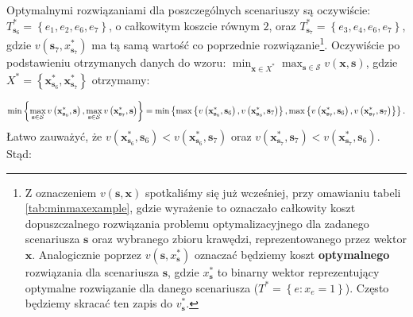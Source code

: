 Optymalnymi rozwiązaniami dla poszczególnych scenariuszy są oczywiście: $T^{\ast}_{\textbf{s}_{6}} = \left\{ e_{1}, e_{2}, e_{6}, e_{7} \right\}$, o całkowitym koszcie równym $2$, oraz $T^{\ast}_{\textbf{s}_{7}} = \left\{ e_{3}, e_{4}, e_{6}, e_{7} \right\}$, gdzie $v \left( \textbf{s}_{7}, x^{\ast}_{\textbf{s}_{7}} \right)$ ma tą samą wartość co poprzednie rozwiązanie\footnote{Z oznaczeniem $v \left( \textbf{s}, \textbf{x} \right)$ spotkaliśmy się już wcześniej, przy omawianiu tabeli \ref{tab:minmaxexample}, gdzie wyrażenie to oznaczało całkowity koszt dopuszczalnego rozwiązania problemu optymalizacyjnego dla zadanego scenariusza $\textbf{s}$ oraz wybranego zbioru krawędzi, reprezentowanego przez wektor $\textbf{x}$. Analogicznie poprzez $v \left( \textbf{s}, x^{\ast}_{\textbf{s}} \right)$ oznaczać będziemy koszt \textbf{optymalnego} rozwiązania dla scenariusza $\textbf{s}$, gdzie $x^{\ast}_{\textbf{s}}$ to binarny wektor reprezentujący optymalne rozwiązanie dla danego scenariusza ($T^{\ast} = \left\{ e : x_{e} = 1 \right\}$). Często będziemy skracać ten zapis do $v^{\ast}_{\textbf{s}}$.}. Oczywiście po podstawieniu otrzymanych danych do wzoru: $\min_{\textbf{x} \in X^{\ast}} \max_{\textbf{s} \in \mathcal{S}} v \left( \textbf{x}, \textbf{s} \right)$, gdzie $X^{\ast} = \left\{ \textbf{x}^{\ast}_{\textbf{s}_{6}}, \textbf{x}^{\ast}_{\textbf{s}_{7}} \right\}$ otrzymamy:

\begin{equation*}
	\min \left\{ \max_{ \mathclap{\textbf{s} \in \mathcal{S}}} v \left( \textbf{x}^{\ast}_{\textbf{s}_{6}}, \textbf{s} \right), \max_{\mathclap{\textbf{s} \in \mathcal{S}}} v \left( \textbf{x}^{\ast}_{\textbf{s}_{7}}, \textbf{s} \right)  \right\} = \min \left\{ \max \left\{ v \left( \textbf{x}^{\ast}_{\textbf{s}_{6}}, \textbf{s}_{6} \right), v \left( \textbf{x}^{\ast}_{\textbf{s}_{6}}, \textbf{s}_{7} \right) \right\}, \max \left\{ v \left( \textbf{x}^{\ast}_{\textbf{s}_{7}}, \textbf{s}_{6} \right), v \left( \textbf{x}^{\ast}_{\textbf{s}_{7}}, \textbf{s}_{7} \right) \right\} \right\}\text{.}
\end{equation*}
Łatwo zauważyć, że $v \left( \textbf{x}^{\ast}_{\textbf{s}_{6}}, \textbf{s}_{6} \right) < v \left( \textbf{x}^{\ast}_{\textbf{s}_{6}}, \textbf{s}_{7} \right)$ oraz $v \left( \textbf{x}^{\ast}_{\textbf{s}_{7}}, \textbf{s}_{7} \right) < v \left( \textbf{x}^{\ast}_{\textbf{s}_{7}}, \textbf{s}_{6} \right)$. Stąd:

